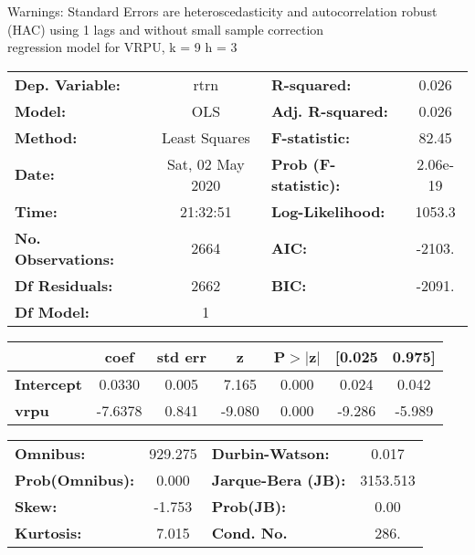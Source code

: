 Warnings: \newline
 [1] Standard Errors are heteroscedasticity and autocorrelation robust (HAC) using 1 lags and without small sample correction\\ 

regression model for VRPU, k = 9 h = 3\begin{center}
\begin{tabular}{lclc}
\toprule
\textbf{Dep. Variable:}    &       rtrn       & \textbf{  R-squared:         } &     0.026   \\
\textbf{Model:}            &       OLS        & \textbf{  Adj. R-squared:    } &     0.026   \\
\textbf{Method:}           &  Least Squares   & \textbf{  F-statistic:       } &     82.45   \\
\textbf{Date:}             & Sat, 02 May 2020 & \textbf{  Prob (F-statistic):} &  2.06e-19   \\
\textbf{Time:}             &     21:32:51     & \textbf{  Log-Likelihood:    } &    1053.3   \\
\textbf{No. Observations:} &        2664      & \textbf{  AIC:               } &    -2103.   \\
\textbf{Df Residuals:}     &        2662      & \textbf{  BIC:               } &    -2091.   \\
\textbf{Df Model:}         &           1      & \textbf{                     } &             \\
\bottomrule
\end{tabular}
\begin{tabular}{lcccccc}
                   & \textbf{coef} & \textbf{std err} & \textbf{z} & \textbf{P$> |$z$|$} & \textbf{[0.025} & \textbf{0.975]}  \\
\midrule
\textbf{Intercept} &       0.0330  &        0.005     &     7.165  &         0.000        &        0.024    &        0.042     \\
\textbf{vrpu}      &      -7.6378  &        0.841     &    -9.080  &         0.000        &       -9.286    &       -5.989     \\
\bottomrule
\end{tabular}
\begin{tabular}{lclc}
\textbf{Omnibus:}       & 929.275 & \textbf{  Durbin-Watson:     } &    0.017  \\
\textbf{Prob(Omnibus):} &   0.000 & \textbf{  Jarque-Bera (JB):  } & 3153.513  \\
\textbf{Skew:}          &  -1.753 & \textbf{  Prob(JB):          } &     0.00  \\
\textbf{Kurtosis:}      &   7.015 & \textbf{  Cond. No.          } &     286.  \\
\bottomrule
\end{tabular}
\end{center}

